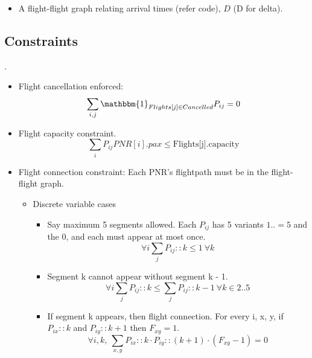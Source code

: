 \documentclass{article}
\providecommand{\cbrak}[1]{\ensuremath{\left\{#1\right\}}}
\DeclareMathOperator*{\argmin}{arg\,min}
\DeclareMathOperator*{\argmax}{arg\,max}
\begin{document}
\begin{flushleft}
\begin{itemize}
    \[\forall i \in PNR,\ i \in P' \iff i.flightpath \cap Cancelled \neq \phi \]
    \item A flight-flight graph relating arrival times (refer code), \(D\) (D for delta).
\end{itemize}

\subsection{Constraints}.

\begin{itemize}
    \item Flight cancellation enforced: \[\sum_{i, j} \mathbbm{1}_{Flights[j] \in Cancelled} P_{ij} = 0\]
    \item Flight capacity constraint. \[\sum_{i}P_{ij}PNR[i].pax \leq \textrm{Flights[j].capacity}\]
    \item Flight connection constraint: Each PNR's flightpath must be in the flight-flight graph. 
    


    \begin{itemize}
        \item Discrete variable cases \begin{itemize}
            \item Say maximum 5 segments allowed. Each \(P_{ij}\) has 5 variants \(1..=5\) and the 0, and each must appear at most once. \[\forall i \sum_{j} P_{ij}::k \leq 1\ \forall k\]
            \item Segment k cannot appear without segment k - 1. \[\forall i \sum_{j} P_{ij}::k \leq \sum_{j} P_{ij}::k - 1\ \forall k \in 2..5\]
            \item If segment k appears, then flight connection. For every i, x, y, if \(P_{ix}::k\) and \(P_{iy}::k + 1\) then \(F_{xy} = 1\). 
            \[\forall i, k,\ \sum_{x, y} P_{ix}::k \cdot P_{iy}::(k + 1) \cdot (F_{xy} - 1) = 0\]


\end{itemize}
\end{itemize}
\end{itemize}
\end{flushleft}
\end{document}
